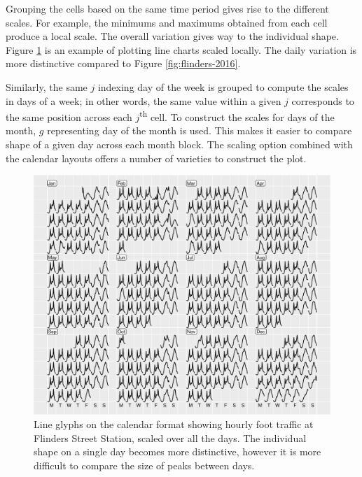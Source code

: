 \documentclass[article]{jss}
\begin{document}
Grouping the cells based on the same time period gives rise to the
different scales. For example, the minimums and maximums obtained from
each cell produce a local scale. The overall variation gives way to the
individual shape. Figure \ref{fig:flinders-free} is an example of
plotting line charts scaled locally. The daily variation is more
distinctive compared to Figure \ref{fig:flinders-2016}.

Similarly, the same \(j\) indexing day of the week is grouped to compute
the scales in days of a week; in other words, the same value within a
given \(j\) corresponds to the same position across each
\(j\)\textsuperscript{th} cell. To construct the scales for days of the
month, \(g\) representing day of the month is used. This makes it easier
to compare shape of a given day across each month block. The scaling
option combined with the calendar layouts offers a number of varieties
to construct the plot.

\begin{CodeChunk}
\begin{figure}

{\centering \includegraphics[width=\textwidth]{figure/flinders-free-1} 

}

\caption[Line glyphs on the calendar format showing hourly foot traffic at Flinders Street Station, scaled over all the days]{Line glyphs on the calendar format showing hourly foot traffic at Flinders Street Station, scaled over all the days. The individual shape on a single day becomes more distinctive, however it is more difficult to compare the size of peaks between days.}\label{fig:flinders-free}
\end{figure}
\end{CodeChunk}
\end{document}

